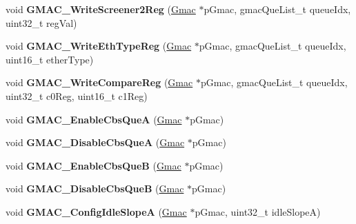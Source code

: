 \begin{DoxyCompactItemize}
\item 
\mbox{\label{group__gmac__defines_gaf6671f30720b79915411e6e8fca6057d}} 
void {\bfseries G\+M\+A\+C\+\_\+\+Write\+Screener2\+Reg} (\mbox{\hyperlink{structGmac}{Gmac}} $\ast$p\+Gmac, gmac\+Que\+List\+\_\+t queue\+Idx, uint32\+\_\+t reg\+Val)
\item 
\mbox{\label{group__gmac__defines_gad249fbf9965b6e9bc4d45c2a264e64f5}} 
void {\bfseries G\+M\+A\+C\+\_\+\+Write\+Eth\+Type\+Reg} (\mbox{\hyperlink{structGmac}{Gmac}} $\ast$p\+Gmac, gmac\+Que\+List\+\_\+t queue\+Idx, uint16\+\_\+t ether\+Type)
\item 
\mbox{\label{group__gmac__defines_ga260234402da6671f0ccdaee5865f7227}} 
void {\bfseries G\+M\+A\+C\+\_\+\+Write\+Compare\+Reg} (\mbox{\hyperlink{structGmac}{Gmac}} $\ast$p\+Gmac, gmac\+Que\+List\+\_\+t queue\+Idx, uint32\+\_\+t c0\+Reg, uint16\+\_\+t c1\+Reg)
\item 
\mbox{\label{group__gmac__defines_ga087d0c64407f77ecc847954fc98772e6}} 
void {\bfseries G\+M\+A\+C\+\_\+\+Enable\+Cbs\+QueA} (\mbox{\hyperlink{structGmac}{Gmac}} $\ast$p\+Gmac)
\item 
\mbox{\label{group__gmac__defines_gae5ac6bf019db9b760fb134ea1867e5cc}} 
void {\bfseries G\+M\+A\+C\+\_\+\+Disable\+Cbs\+QueA} (\mbox{\hyperlink{structGmac}{Gmac}} $\ast$p\+Gmac)
\item 
\mbox{\label{group__gmac__defines_ga5af96a6d79427de08d0c83acd5ff41cd}} 
void {\bfseries G\+M\+A\+C\+\_\+\+Enable\+Cbs\+QueB} (\mbox{\hyperlink{structGmac}{Gmac}} $\ast$p\+Gmac)
\item 
\mbox{\label{group__gmac__defines_ga1fac650ad946a5545cc0929309794353}} 
void {\bfseries G\+M\+A\+C\+\_\+\+Disable\+Cbs\+QueB} (\mbox{\hyperlink{structGmac}{Gmac}} $\ast$p\+Gmac)
\item 
\mbox{\label{group__gmac__defines_ga113ababdc6bb17c13685ff2c06b9e7fb}} 
void {\bfseries G\+M\+A\+C\+\_\+\+Config\+Idle\+SlopeA} (\mbox{\hyperlink{structGmac}{Gmac}} $\ast$p\+Gmac, uint32\+\_\+t idle\+SlopeA)
\item 

\end{DoxyCompactItemize}

